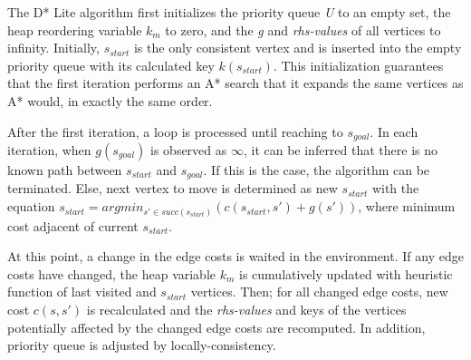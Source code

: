 \documentclass[10pt,journal]{IEEEtran}
\begin{document}

The D* Lite algorithm first initializes the priority queue \textit{U} to an empty set, the heap reordering variable $k_{m}$ to zero, and the \textit{g} and \textit{rhs-values} of all vertices to infinity. Initially, $s_{start}$ is the only consistent vertex and is inserted into the empty priority queue with its calculated key $k(s_{start})$. This initialization guarantees that the first iteration performs an A* search that it expands the same vertices as A* would, in exactly the same order.

After the first iteration, a loop is processed until reaching to $s_{goal}$. In each iteration, when $g(s_{goal})$ is observed as $\infty$, it can be inferred that there is no known path between $s_{start}$ and $s_{goal}$. If this is the case, the algorithm can be terminated. Else, next vertex to move is determined as new $s_{start}$ with the equation $s_{start} = argmin_{s' \in succ(s_{start})}(c(s_{start},s') + g(s'))$, where minimum cost adjacent of current $s_{start}$.

At this point, a change in the edge costs is waited in the environment. If any edge costs have changed, the heap variable $k_{m}$ is cumulatively updated with heuristic function of last visited and $s_{start}$ vertices. Then; for all changed edge costs, new cost $c(s, s')$ is recalculated and the \textit{rhs-values} and keys of the vertices potentially affected by the changed edge costs are recomputed. In addition, priority queue is adjusted by locally-consistency. 
\end{document}
